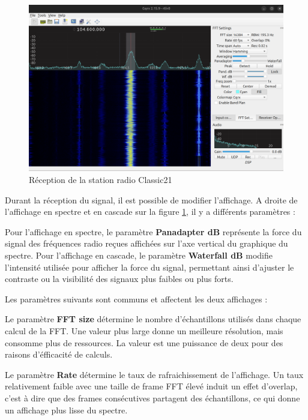 \newpage

\begin{figure}[h]
\centering

\includegraphics[scale=0.18]{images/gqrx1.png}
\caption{Réception de la station radio Classic21}\label{term38}
\end{figure}

Durant la réception du signal, il est possible de modifier l'affichage. A droite de l'affichage en spectre et en cascade sur la figure \ref{term38}, il y a différents paramètres :

Pour l'affichage en spectre, le paramètre \textbf{Panadapter dB} représente la force du signal des fréquences radio reçues affichées sur l'axe vertical du graphique du spectre. Pour l'affichage en cascade, le paramètre \textbf{Waterfall dB} modifie l'intensité utilisée pour afficher la force du signal, permettant ainsi d'ajuster le contraste ou la visibilité des signaux plus faibles ou plus forts. 

\vspace{0.1cm}

Les paramètres suivants sont communs et affectent les deux affichages :

\vspace{0.1cm}

Le paramètre \textbf{FFT size} détermine le nombre d'échantillons utilisés dans chaque calcul de la \ac{FFT}. Une valeur plus large donne un meilleure résolution, mais consomme plus de ressources. La valeur est une puissance de deux pour des raisons d'éfficacité de calculs.

\vspace{0.1cm}

Le paramètre \textbf{Rate} détermine le taux de rafraichissement de l'affichage. Un taux relativement faible avec une taille de frame \ac{FFT} élevé induit un effet d'overlap, c'est à dire que des frames consécutives partagent des échantillons, ce qui donne un affichage plus lisse du spectre.


